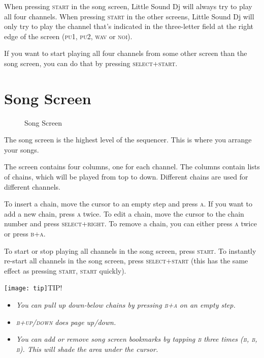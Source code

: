 When pressing \textsc{start} in the song screen, Little Sound Dj will always try to play all four
channels. When pressing \textsc{start} in the other screens, Little Sound Dj will only try to play the
channel that's indicated in the three-letter field at the right edge of the screen (\textsc{pu1}, \textsc{pu2}, \textsc{wav} or \textsc{noi}).

If you want to start playing all four channels from some other screen than the song screen,
you can do that by pressing \textsc{select+start}.

\section{Song Screen}

\begin{figure}[hbtp]
\centering
{}
\caption{Song Screen}
\end{figure}

The song screen
is the highest level of the sequencer. This is where you arrange your songs.

The screen contains four columns, one for each channel. The columns contain lists of chains, which will be played from top to down. Different chains are used for different channels.

To insert a chain, move the cursor to an empty step and press \textsc{a}. If you want to add a new
chain, press \textsc{a} twice. To edit a chain, move the cursor to the chain number and press
\textsc{select+right}. To remove a chain, you can either press \textsc{a} twice or
press \textsc{b+a}.

To start or stop playing all channels in the song screen, press \textsc{start}. To instantly re-start all channels in the song screen, press \textsc{select+start} (this has the same effect as pressing \textsc{start, start} quickly).

\texttt{[image: tip]}TIP!
\begin{itemize}
\item \textit{You can pull up down-below chains by pressing \textsc{b+a} on an empty step.}
\item \textit{\textsc{b+up/down} does page up/down.}
\item \textit{You can add or remove song screen bookmarks by tapping \textsc{b} three times \textsc{(b, b, b)}. This will shade the area under the cursor.}
\end{itemize}

